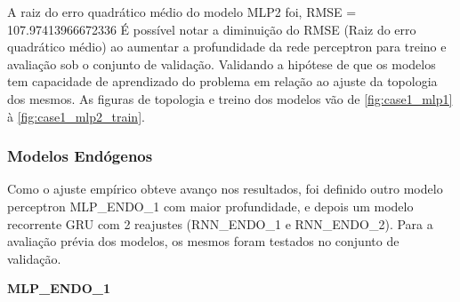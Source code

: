 \documentclass[	12pt, Times, openright, twoside, a4paper, english, brazil]{abntex2}
\begin{document}
                 A raiz do erro quadrático médio do modelo MLP2 foi, RMSE = 107.97413966672336
    	        É possível notar a diminuição do RMSE (Raiz do erro quadrático médio) ao aumentar a profundidade da rede perceptron para treino e avaliação sob o conjunto de validação. Validando a hipótese de que os modelos tem capacidade de aprendizado do problema em relação ao ajuste da topologia dos mesmos.
    	        As figuras de topologia e treino dos modelos vão de \ref{fig:case1_mlp1} à \ref{fig:case1_mlp2_train}.
          \subsubsection{Modelos Endógenos}
    	        Como o ajuste empírico obteve avanço nos resultados, foi definido outro modelo perceptron MLP\_ENDO\_1 com maior profundidade, e depois um modelo recorrente GRU com 2 reajustes (RNN\_ENDO\_1 e RNN\_ENDO\_2).
                Para a avaliação prévia dos modelos, os mesmos foram testados no conjunto de validação.
                
                
              {\textbf{MLP\_ENDO\_1}}
              
              
      	        \begin{figure}[H]
                \end{figure}
\end{document}
